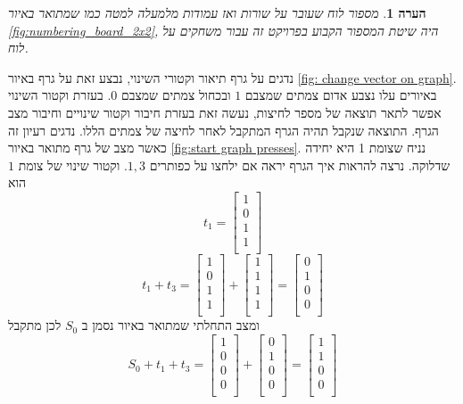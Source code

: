 \documentclass[12pt,leqno]{article}
\theoremstyle{theoremdd}
\newtheorem{comm}{הערה}[section]
\begin{document}
\begin{comm}
    \label{ comm: indexing board game}
    מספור לוח שעובר על שורות ואז עמודות מלמעלה למטה כמו שמתואר באיור
    \ref{fig:numbering_board_2x2},
     היה שיטת המספור הקבוע בפרויקט זה עבור משחקים על לוח.
\end{comm}
נדגים על גרף תיאור וקטורי השינוי,
נבצע זאת על גרף באיור
\ref{fig: change vector on graph}.
באיורים עלו נצבע אדום צמתים שמצבם  
$1$
ובכחול 
צמתים שמצבם 
$0$.
בעזרת וקטור השינוי אפשר לתאר תוצאה של מספר לחיצות,
נעשה זאת בעזרת חיבור וקטור שינויים
וחיבור מצב הגרף.
התוצאה שנקבל 
תהיה הגרף המתקבל לאחר לחיצה של צמתים
הללו.
נדגים רעיון זה כאשר מצב של גרף מתואר באיור
\ref{fig:start graph presses}.
נניח שצומת 1 היא יחידה שדלוקה.
נרצה להראות איך הגרף יראה אם ילחצו על כפותרים 
$1, 3$.
וקטור שינוי של צומת 
$1$
הוא
\[
    t_1 = 
    \begin{bmatrix}
        1 \\
        0 \\
        1 \\
        1 \\
    \end{bmatrix}
\]
\[
    t_1 + t_3 = 
    \begin{bmatrix}
        1 \\
        0 \\
        1 \\
        1 \\
    \end{bmatrix}
    +
    \begin{bmatrix}
        1 \\
        1 \\
        1 \\
        1 \\
    \end{bmatrix}
    =
    \begin{bmatrix}
        0 \\
        1 \\
        0 \\
        0 \\
    \end{bmatrix}
\]
ומצב התחלתי שמתואר באיור נסמן ב
$S_0$
לכן מתקבל
\[
    S_0 + t_1 + t_3 = 
    \begin{bmatrix}
        1 \\
        0 \\
        0 \\
        0 \\
    \end{bmatrix}
    +
    \begin{bmatrix}
        0 \\
        1 \\
        0 \\
        0 \\
    \end{bmatrix}
    =
    \begin{bmatrix}
        1 \\
        1 \\
        0 \\
        0 \\
    \end{bmatrix}
\]
\end{document}
